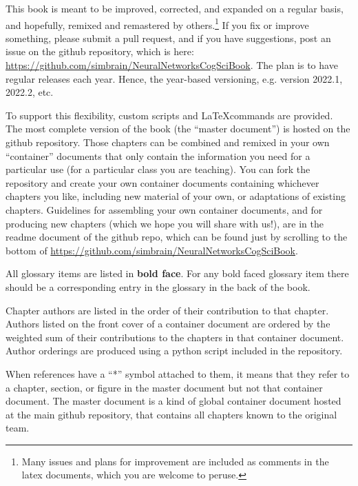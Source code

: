 This book is meant to be improved, corrected, and expanded on a regular basis, and hopefully, remixed and remastered by others.\footnote{Many issues and plans for improvement are included as comments in the latex documents, which you are welcome to peruse.} If you fix or improve something, please submit a pull request, and if you have suggestions, post an issue on the github repository, which is here: \url{https://github.com/simbrain/NeuralNetworksCogSciBook}. The plan is to have regular releases each year. Hence, the year-based versioning, e.g. version 2022.1, 2022.2, etc.

To support this flexibility, custom scripts and \LaTeX commands are provided. The most complete version of the book (the ``master document'') is hosted on the github repository. Those chapters can be combined and remixed in your own ``container'' documents that only contain the information you need for a particular use (\eg for a particular class you are teaching). You can fork the repository and  create your own container documents containing whichever chapters you like, including new material of your own, or adaptations of existing chapters. Guidelines for assembling your own container documents, and for producing new chapters (which we hope you will share with us!), are in the readme document of the github repo, which can be found just by scrolling to the bottom of \url{https://github.com/simbrain/NeuralNetworksCogSciBook}.

All glossary items are listed in \textbf{bold face}. For any bold faced glossary item there should be a corresponding entry in the glossary in the back of the book.

Chapter authors are listed in the order of their contribution to that chapter. Authors listed on the front cover of a container document are ordered by the weighted sum of their contributions to the chapters in that container document. Author orderings are produced using a python script included in the repository.

When references have a ``*'' symbol attached to them, it means that they refer to a chapter, section, or figure in the master document but not that container document. The master document is a kind of global container document hosted at the main github repository, that contains all chapters known to the original team.

